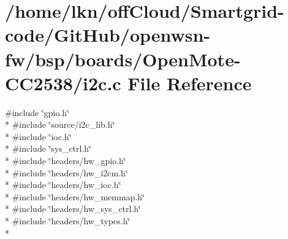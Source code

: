 \hypertarget{_open_mote-_c_c2538_2i2c_8c}{}\section{/home/lkn/off\+Cloud/\+Smartgrid-\/code/\+Git\+Hub/openwsn-\/fw/bsp/boards/\+Open\+Mote-\/\+C\+C2538/i2c.c File Reference}
\label{_open_mote-_c_c2538_2i2c_8c}
{\ttfamily \#include \char`\"{}gpio.\+h\char`\"{}}\\*
{\ttfamily \#include \char`\"{}source/i2c\+\_\+lib.\+h\char`\"{}}\\*
{\ttfamily \#include \char`\"{}ioc.\+h\char`\"{}}\\*
{\ttfamily \#include \char`\"{}sys\+\_\+ctrl.\+h\char`\"{}}\\*
{\ttfamily \#include \char`\"{}headers/hw\+\_\+gpio.\+h\char`\"{}}\\*
{\ttfamily \#include \char`\"{}headers/hw\+\_\+i2cm.\+h\char`\"{}}\\*
{\ttfamily \#include \char`\"{}headers/hw\+\_\+ioc.\+h\char`\"{}}\\*
{\ttfamily \#include \char`\"{}headers/hw\+\_\+memmap.\+h\char`\"{}}\\*
{\ttfamily \#include \char`\"{}headers/hw\+\_\+sys\+\_\+ctrl.\+h\char`\"{}}\\*
{\ttfamily \#include \char`\"{}headers/hw\+\_\+types.\+h\char`\"{}}\\*
